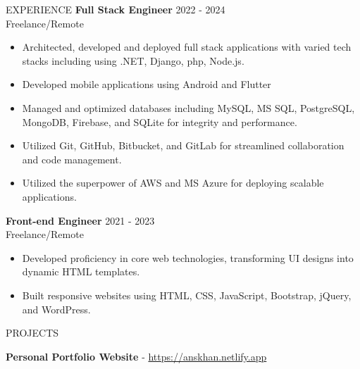 \documentclass{resume} %
\begin{document}
\begin{rSection}{EXPERIENCE}
	\textbf{Full Stack Engineer} \hfill 2022 - 2024\\
	Freelance/Remote %
	\begin{itemize}
		\itemsep -3pt {} 
		\item Architected, developed and deployed full stack applications with varied tech stacks including using .NET, Django, php, Node.js.
		\item Developed mobile applications using Android and Flutter
		\item Managed and optimized databases including MySQL, MS SQL, PostgreSQL, MongoDB, Firebase, and SQLite for integrity and performance. 
		\item Utilized Git, GitHub, Bitbucket, and GitLab for streamlined collaboration and code management.
		\item Utilized the superpower of AWS and MS Azure for deploying scalable applications.
	\end{itemize}
	
	
	\textbf{Front-end Engineer} \hfill 2021  - 2023\\
	Freelance/Remote  \hfill %
	\begin{itemize}
		\itemsep -3pt {} 
		\item Developed proficiency in core web technologies, transforming UI designs into dynamic HTML templates.
		\item Built responsive websites using HTML, CSS, JavaScript, Bootstrap, jQuery, and WordPress. \\
		
	\end{itemize}
	
	
	

  
\begin{rSection}{PROJECTS}
\vspace{-1.25em}
\item \textbf{Personal Portfolio Website}  - \href{https://anskhan.netlify.app}{https://anskhan.netlify.app}


\end{rSection}
\end{rSection}
\end{document}
